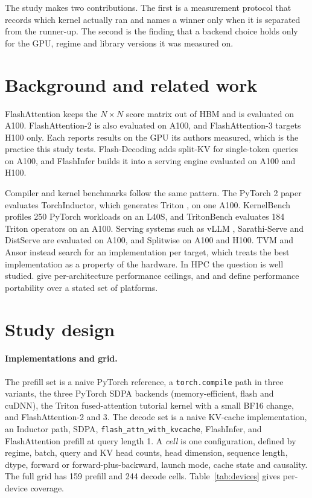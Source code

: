 \documentclass[11pt]{article}
\newcommand{\code}[1]{\texttt{\small #1}}
\begin{document}
The study makes two contributions. The first is a measurement protocol that
records which kernel actually ran and names a winner only when it is separated
from the runner-up. The second is the finding that a backend choice holds only
for the GPU, regime and library versions it was measured on.

\section{Background and related work}

FlashAttention \citep{dao2022flashattention} keeps the $N \times N$ score matrix
out of HBM and is evaluated on A100. FlashAttention-2
\citep{dao2023flashattention2} is also evaluated on A100, and FlashAttention-3
\citep{shah2024flashattention3} targets H100 only. Each reports results on the
GPU its authors measured, which is the practice this study tests.
Flash-Decoding \citep{dao2023flashdecoding} adds split-KV for single-token
queries on A100, and FlashInfer \citep{ye2025flashinfer} builds it into a
serving engine evaluated on A100 and H100.

Compiler and kernel benchmarks follow the same pattern. The PyTorch 2 paper
\citep{ansel2024pytorch2} evaluates TorchInductor, which generates Triton
\citep{tillet2019triton}, on one A100. KernelBench \citep{ouyang2025kernelbench}
profiles 250 PyTorch workloads on an L40S, and TritonBench
\citep{li2025tritonbench} evaluates 184 Triton operators on an A100. Serving
systems such as vLLM \citep{kwon2023vllm}, Sarathi-Serve
\citep{agrawal2024sarathi} and DistServe \citep{zhong2024distserve} are
evaluated on A100, and Splitwise \citep{patel2024splitwise} on A100 and H100.
TVM \citep{chen2018tvm} and Ansor \citep{zheng2020ansor} instead search for an
implementation per target, which treats the best implementation as a property
of the hardware. In HPC the question is well studied.
\citet{williams2009roofline} give per-architecture performance ceilings, and
\citet{pennycook2016metric} and \citet{deakin2019portability} define
performance portability over a stated set of platforms.

\section{Study design}

\paragraph{Implementations and grid.} The prefill set is a naive PyTorch
reference, a \code{torch.compile} path in three variants, the three PyTorch SDPA
backends (memory-efficient, flash and cuDNN), the Triton fused-attention
tutorial kernel with a small BF16 change, and FlashAttention-2 and 3. The decode
set is a naive KV-cache implementation, an Inductor path, SDPA,
\code{flash\_attn\_with\_kvcache}, FlashInfer, and FlashAttention prefill at
query length 1. A \emph{cell} is one configuration, defined by regime, batch,
query and KV head counts, head dimension, sequence length, dtype, forward or
forward-plus-backward, launch mode, cache state and causality. The full grid
has 159 prefill and 244 decode cells. Table~\ref{tab:devices} gives per-device
coverage.
\end{document}
